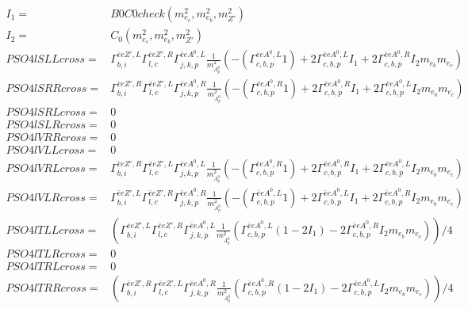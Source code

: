 \documentclass[A4,landscape]{article}
\begin{document}
\begin{align} 
I_1= & B0C0check(m^2_{e_{{c}}}, m^2_{e_{{b}}}, m^2_{{Z'}}) \\ 
I_2= & C_0(m^2_{e_{{c}}}, m^2_{e_{{b}}}, m^2_{{Z'}}) \\ 
  PSO4lSLLcross= &  \Gamma^{\bar{e}e {Z'} ,L}_{b, i} \Gamma^{\bar{e}e {Z'} ,R}_{l, c} \Gamma^{\bar{e}e A^0 ,L}_{j, k, p} \frac{1}{m^2_{A^0_{{p}}}} (-(\Gamma^{\bar{e}e A^0 ,L}_{c, b, p} 1) + 2 \Gamma^{\bar{e}e A^0 ,L}_{c, b, p} I_1 + 2 \Gamma^{\bar{e}e A^0 ,R}_{c, b, p} I_2 m_{e_{{b}}} m_{e_{{c}}}) \\ 
  PSO4lSRRcross= &  \Gamma^{\bar{e}e {Z'} ,R}_{b, i} \Gamma^{\bar{e}e {Z'} ,L}_{l, c} \Gamma^{\bar{e}e A^0 ,R}_{j, k, p} \frac{1}{m^2_{A^0_{{p}}}} (-(\Gamma^{\bar{e}e A^0 ,R}_{c, b, p} 1) + 2 \Gamma^{\bar{e}e A^0 ,R}_{c, b, p} I_1 + 2 \Gamma^{\bar{e}e A^0 ,L}_{c, b, p} I_2 m_{e_{{b}}} m_{e_{{c}}}) \\ 
  PSO4lSRLcross= & 0 \\ 
  PSO4lSLRcross= & 0 \\ 
  PSO4lVRRcross= & 0 \\ 
  PSO4lVLLcross= & 0 \\ 
  PSO4lVRLcross= &  \Gamma^{\bar{e}e {Z'} ,R}_{b, i} \Gamma^{\bar{e}e {Z'} ,L}_{l, c} \Gamma^{\bar{e}e A^0 ,L}_{j, k, p} \frac{1}{m^2_{A^0_{{p}}}} (-(\Gamma^{\bar{e}e A^0 ,R}_{c, b, p} 1) + 2 \Gamma^{\bar{e}e A^0 ,R}_{c, b, p} I_1 + 2 \Gamma^{\bar{e}e A^0 ,L}_{c, b, p} I_2 m_{e_{{b}}} m_{e_{{c}}}) \\ 
  PSO4lVLRcross= &  \Gamma^{\bar{e}e {Z'} ,L}_{b, i} \Gamma^{\bar{e}e {Z'} ,R}_{l, c} \Gamma^{\bar{e}e A^0 ,R}_{j, k, p} \frac{1}{m^2_{A^0_{{p}}}} (-(\Gamma^{\bar{e}e A^0 ,L}_{c, b, p} 1) + 2 \Gamma^{\bar{e}e A^0 ,L}_{c, b, p} I_1 + 2 \Gamma^{\bar{e}e A^0 ,R}_{c, b, p} I_2 m_{e_{{b}}} m_{e_{{c}}}) \\ 
  PSO4lTLLcross= & ( \Gamma^{\bar{e}e {Z'} ,L}_{b, i} \Gamma^{\bar{e}e {Z'} ,R}_{l, c} \Gamma^{\bar{e}e A^0 ,L}_{j, k, p} \frac{1}{m^2_{A^0_{{p}}}} (\Gamma^{\bar{e}e A^0 ,L}_{c, b, p} (1 - 2 I_1) - 2 \Gamma^{\bar{e}e A^0 ,R}_{c, b, p} I_2 m_{e_{{b}}} m_{e_{{c}}}))/4 \\ 
  PSO4lTLRcross= & 0 \\ 
  PSO4lTRLcross= & 0 \\ 
  PSO4lTRRcross= & ( \Gamma^{\bar{e}e {Z'} ,R}_{b, i} \Gamma^{\bar{e}e {Z'} ,L}_{l, c} \Gamma^{\bar{e}e A^0 ,R}_{j, k, p} \frac{1}{m^2_{A^0_{{p}}}} (\Gamma^{\bar{e}e A^0 ,R}_{c, b, p} (1 - 2 I_1) - 2 \Gamma^{\bar{e}e A^0 ,L}_{c, b, p} I_2 m_{e_{{b}}} m_{e_{{c}}}))/4 \\ 
\end{align} 
\end{document}
